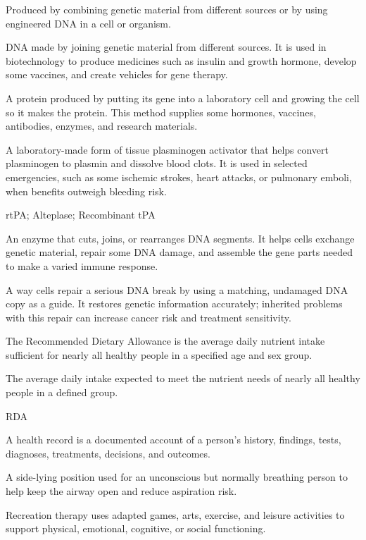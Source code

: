  Produced by combining genetic material from different sources or by using engineered DNA in a cell or organism.

 DNA made by joining genetic material from different sources. It is used in biotechnology to produce medicines such as insulin and growth hormone, develop some vaccines, and create vehicles for gene therapy.

 A protein produced by putting its gene into a laboratory cell and growing the cell so it makes the protein. This method supplies some hormones, vaccines, antibodies, enzymes, and research materials.

 A laboratory-made form of tissue plasminogen activator that helps convert plasminogen to plasmin and dissolve blood clots. It is used in selected emergencies, such as some ischemic strokes, heart attacks, or pulmonary emboli, when benefits outweigh bleeding risk.

\synonyms
rtPA; Alteplase; Recombinant tPA

 An enzyme that cuts, joins, or rearranges DNA segments. It helps cells exchange genetic material, repair some DNA damage, and assemble the gene parts needed to make a varied immune response.

 A way cells repair a serious DNA break by using a matching, undamaged DNA copy as a guide. It restores genetic information accurately; inherited problems with this repair can increase cancer risk and treatment sensitivity.

 The Recommended Dietary Allowance is the average daily nutrient intake sufficient for nearly all healthy people in a specified age and sex group.

 The average daily intake expected to meet the nutrient needs of nearly all healthy people in a defined group.

\synonyms
RDA

 A health record is a documented account of a person’s history, findings, tests, diagnoses, treatments, decisions, and outcomes.

 A side-lying position used for an unconscious but normally breathing person to help keep the airway open and reduce aspiration risk.

 Recreation therapy uses adapted games, arts, exercise, and leisure activities to support physical, emotional, cognitive, or social functioning.

